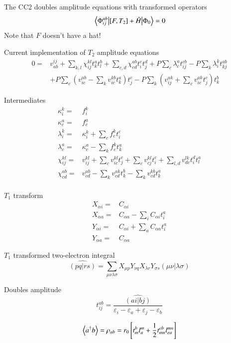 \documentclass[aip,jcp,reprint,amsmath,amssymb,floatfix,citeautoscript,nofootinbib,onecolumn]{revtex4-2}
\begin{document}
The CC2 doubles amplitude equations with transformed operators
\begin{equation}
    \mel{\Phi^{ab}_{ij}}{\left[F,T_2\right]+\hat{H}}{\Phi_0}=0
\end{equation}
Note that $F$ doesn't have a hat!

Current implementation of $T_2$ amplitude equations
\begin{equation}
    \begin{aligned}
        0=&v^{ij}_{ab}+\sum_{k,l}\chi^{kl}_{ij}t^a_kt^b_l+\sum_{c,d}\chi^{ab}_{cd}t^c_it^d_j+P\sum_c\lambda^a_ct^{cb}_{ij}-P\sum_k\lambda^k_it^{ab}_{kj}\\
        &+P\sum_c\left(v^{ab}_{ic}-\sum_kv^{kb}_{ic}t^a_k\right)t^c_j-P\sum_k\left(v^{ak}_{ij}+\sum_cv^{ak}_{ic}t^c_j\right)t^b_k
    \end{aligned}
\end{equation}

Intermediates
\begin{align}
    \kappa^k_i=&f^k_i\\
    \kappa^a_c=&f^a_c\\
    \lambda^k_i=&\kappa^k_i+\sum_cf^k_ct^c_i\\
    \lambda^a_c=&\kappa^a_c-\sum_kf^k_ct^a_k\\
    \chi^{kl}_{ij}=&v^{kl}_{ij}+\sum_cv^{kl}_{ic}t^c_j+\sum_cv^{kl}_{cj}t^c_i+\sum_{l,d}v^{lk}_{dc}t^d_it^a_l\\
    \chi^{ab}_{cd}=&v^{ab}_{cd}-\sum_kv^{ak}_{cd}t^b_k-\sum_kv^{kb}_{cd}t^a_k\\
\end{align}

$T_1$ transform
\begin{align}
    X_{\alpha i}=&C_{\alpha i}\\
    X_{\alpha a}=&C_{\alpha a}-\sum_iC_{\alpha i}t^a_i\\
    Y_{\alpha i}=&C_{\alpha i}+\sum_aC_{\alpha a}t^a_i\\
    Y_{\alpha a}=&C_{\alpha a}
\end{align}

$T_1$ transformed two-electron integral
\begin{equation}
    \hat{\left(pq|rs\right)}=\sum_{\mu\nu\lambda\sigma}X_{\mu p}Y_{\nu q}X_{\lambda r}Y_{\sigma s}\left(\mu\nu|\lambda\sigma\right)
\end{equation}

Doubles amplitude
\begin{equation}
    t^{ab}_{ij}=\frac{\hat{\left(ai|bj\right)}}{\varepsilon_i-\varepsilon_a+\varepsilon_j-\varepsilon_b}
\end{equation}


\begin{equation}
    \expval{a^\dagger b}=\rho_{ab} = r_0\left[t^b_ml^m_a+\frac{1}{2}t^{eb}_{mn}l^{mn}_{ea}\right]
\end{equation}
\end{document}
